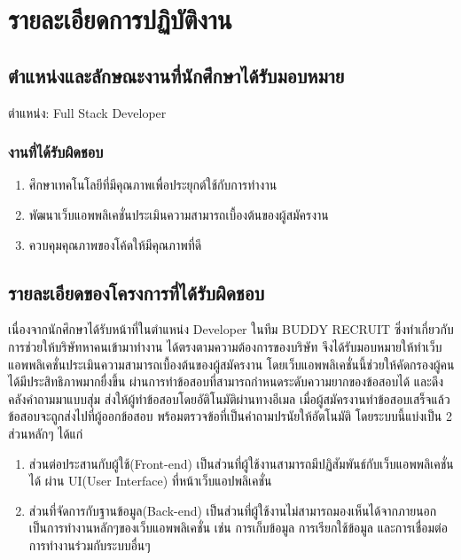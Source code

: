 \chapter{รายละเอียดการปฏิบัติงาน}
\label{chapter:related-theory}

\section{ตำแหน่งและลักษณะงานที่นักศึกษาได้รับมอบหมาย}

ตำแหน่ง: Full Stack Developer

\subsection{งานที่ได้รับผิดชอบ}

\begin{enumerate}
  \item ศึกษาเทคโนโลยีที่มีคุณภาพเพื่อประยุกต์ใช้กับการทำงาน
  \item พัฒนาเว็บแอพพลิเคชั่นประเมินความสามารถเบื้องต้นของผู้สมัครงาน
  \item ควบคุมคุณภาพของโค้ดให้มีคุณภาพที่ดี
\end{enumerate}

\section{รายละเอียดของโครงการที่ได้รับผิดชอบ}

เนื่องจากนักศึกษาได้รับหน้าที่ในตำแหน่ง Developer ในทีม BUDDY RECRUIT ซิ่งทำเกี่ยวกับการช่วยให้บริษัทหาคนเข้ามาทำงาน ได้ตรงตามความต้องการของบริษัท จึงได้รับมอบหมายให้ทำเว็บแอพพลิเคชั่นประเมินความสามารถเบื้องต้นของผู้สมัครงาน โดยเว็บแอพพลิเคชั่นนี้ช่วยให้คัดกรองผู้คนได้มีประสิทธิภาพมากยื่งขึ้น ผ่านการทำข้อสอบที่สามารถกำหนดระดับความยากของข้อสอบได้ และดึงคลังคำถามมาแบบสุ่ม ส่งให้ผู้ทำข้อสอบโดยอัติโนมัติผ่านทางอีเมล เมื่อผู้สมัครงานทำข้อสอบเสร็จแล้ว ข้อสอบจะถูกส่งไปที่ผู้ออกข้อสอบ พร้อมตรวจข้อที่เป็นคำถามปรนัยให้อัตโนมัติ โดยระบบนี้แบ่งเป็น 2 ส่วนหลักๆ ได้แก่

\begin{enumerate}
  \item ส่วนต่อประสานกับผู้ใช้(Front-end) เป็นส่วนที่ผู้ใช้งานสามารถมีปฏิสัมพันธ์กับเว็บแอพพลิเคชั่นได้ ผ่าน UI(User Interface) ที่หน้าเว็บแอปพลิเคชั่น
  \item ส่วนที่จัดการกับฐานข้อมูล(Back-end) เป็นส่วนที่ผู้ใช้งานไม่สามารถมองเห็นได้จากภายนอก เป็นการทำงานหลักๆของเว็บแอพพลิเคชั่น เช่น การเก็บข้อมูล การเรียกใช้ข้อมูล และการเชื่อมต่อการทำงานร่วมกับระบบอื่นๆ
\end{enumerate}

